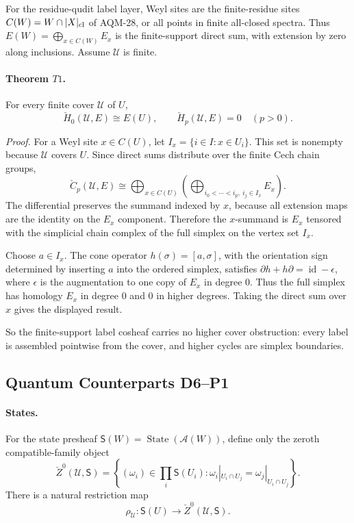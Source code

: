 For the residue-qudit label layer, Weyl sites are the finite-residue sites
\(C(W)=W\cap |X|_{\rm cl}\) of AQM-28, or all points in finite all-closed
spectra.  Thus \(E(W)=\bigoplus_{x\in C(W)}E_x\) is the finite-support direct
sum, with extension by zero along inclusions.  Assume \(\mathcal U\) is finite.

\paragraph{Theorem \(T1\).}
For every finite cover \(\mathcal U\) of \(U\),
\[
  \check H_0(\mathcal U,E)\cong E(U),
  \qquad
  \check H_p(\mathcal U,E)=0\quad(p>0).
\]

\emph{Proof.}
For a Weyl site \(x\in C(U)\), let \(I_x=\{i\in I:x\in U_i\}\).  This set is
nonempty because \(\mathcal U\) covers \(U\).  Since direct sums distribute
over the finite Cech chain groups,
\[
  \check C_p(\mathcal U,E)
  \cong
  \bigoplus_{x\in C(U)}
  \left(
    \bigoplus_{i_0<\cdots<i_p,\ i_j\in I_x}E_x
  \right).
\]
The differential preserves the summand indexed by \(x\), because all
extension maps are the identity on the \(E_x\) component.  Therefore the
\(x\)-summand is \(E_x\) tensored with the simplicial chain complex of the
full simplex on the vertex set \(I_x\).

Choose \(a\in I_x\).  The cone operator \(h(\sigma)=[a,\sigma]\), with the
orientation sign determined by inserting \(a\) into the ordered simplex,
satisfies \(\partial h+h\partial=\operatorname{id}-\epsilon\), where
\(\epsilon\) is the augmentation to one copy of \(E_x\) in degree \(0\).  Thus
the full simplex has homology \(E_x\) in degree \(0\) and \(0\) in higher
degrees.  Taking the direct sum over \(x\) gives the displayed result.

So the finite-support label cosheaf carries no higher cover obstruction: every
label is assembled pointwise from the cover, and higher cycles are simplex
boundaries.

\subsection{Quantum Counterparts D6--P1}

\paragraph{States.}
For the state presheaf \(\mathsf S(W)=\operatorname{State}(\mathcal A(W))\),
define only the zeroth compatible-family object
\[
  \check Z^0(\mathcal U,\mathsf S)=
  \left\{(\omega_i)\in\prod_i\mathsf S(U_i):
  \omega_i|_{U_i\cap U_j}=\omega_j|_{U_i\cap U_j}\right\}.
\]
There is a natural restriction map
\[
  \rho_{\mathcal U}:\mathsf S(U)\longrightarrow
  \check Z^0(\mathcal U,\mathsf S).
\]

